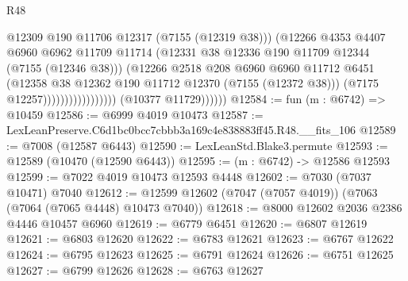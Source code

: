 \begin{lexlean}{R48}
\begin{coremodule}
                                            @12309
                                            @190
                                            @11706
                                            @12317
                                            (@7155 (@12319 @38)))
                                          (@12266
                                            @4353
                                            @4407
                                            @6960
                                            @6962
                                            @11709
                                            @11714
                                            (@12331
                                              @38
                                              @12336
                                              @190
                                              @11709
                                              @12344
                                              (@7155 (@12346 @38)))
                                            (@12266
                                              @2518
                                              @208
                                              @6960
                                              @6960
                                              @11712
                                              @6451
                                              (@12358
                                                @38
                                                @12362
                                                @190
                                                @11712
                                                @12370
                                                (@7155 (@12372 @38)))
                                              (@7175 @12257)))))))))))))))))
              (@10377 @11729))))))
@12584 := fun (m : @6742) => @10459
@12586 := @6999 @4019 @10473
@12587 := LexLeanPreserve.C6d1bc0bcc7cbbb3a169c4e838883ff45.R48.__fits_106
@12589 := @7008 (@12587 @6443)
@12590 := LexLeanStd.Blake3.permute
@12593 := @12589 (@10470 (@12590 @6443))
@12595 := (m : @6742) -> @12586 @12593
@12599 := @7022 @4019 @10473 @12593 @4448
@12602 := @7030 (@7037 @10471) @7040
@12612 := @12599 @12602 (@7047 (@7057 @4019)) (@7063 (@7064 (@7065 @4448) @10473 @7040))
@12618 := @8000 @12602 @2036 @2386 @4446 @10457 @6960
@12619 := @6779 @6451
@12620 := @6807 @12619
@12621 := @6803 @12620
@12622 := @6783 @12621
@12623 := @6767 @12622
@12624 := @6795 @12623
@12625 := @6791 @12624
@12626 := @6751 @12625
@12627 := @6799 @12626
@12628 := @6763 @12627

\end{coremodule}
\end{lexlean}
